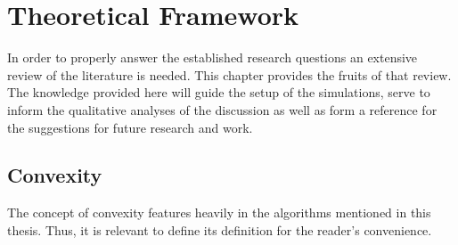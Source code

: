 \chapter{Theoretical Framework} \label{ch2:theoframe}

In order to properly answer the established research questions an extensive review of the literature is needed. This chapter provides the fruits of that review. The knowledge provided here will guide the setup of the simulations, serve to inform the qualitative analyses of the discussion as well as form a reference for the suggestions for future research and work.

\section{Convexity}

The concept of convexity features heavily in the algorithms mentioned in this thesis. Thus, it is relevant to define its definition for the reader's convenience.

